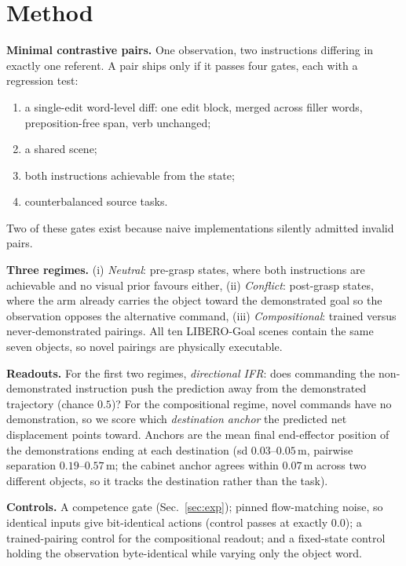 \documentclass{article}
\begin{document}
\section{Method}
\label{sec:method}

\textbf{Minimal contrastive pairs.} One observation, two instructions differing in exactly one
referent. A pair ships only if it passes four gates, each with a regression test:
\begin{enumerate}[leftmargin=2em,itemsep=0pt,topsep=2pt,label=(\roman*)]
\item a single-edit word-level diff: one edit block, merged across filler words,
  preposition-free span, verb unchanged;
\item a shared scene;
\item both instructions achievable from the state;
\item counterbalanced source tasks.
\end{enumerate}
Two of these gates exist because naive implementations silently admitted invalid pairs.

\textbf{Three regimes.} (i) \emph{Neutral}: pre-grasp states, where both instructions are
achievable and no visual prior favours either, (ii) \emph{Conflict}: post-grasp states, where the arm
already carries the object toward the demonstrated goal so the observation opposes the
alternative command, (iii) \emph{Compositional}: trained versus never-demonstrated pairings. All ten
LIBERO-Goal scenes contain the same seven objects, so novel pairings are physically executable.

\textbf{Readouts.} For the first two regimes, \emph{directional IFR}: does commanding the
non-demonstrated instruction push the prediction away from the demonstrated trajectory (chance
$0.5$)? For the compositional regime, novel commands have no demonstration, so we score which
\emph{destination anchor} the predicted net displacement points toward. Anchors are the mean
final end-effector position of the demonstrations ending at each destination (sd
$0.03$--$0.05$\,m, pairwise separation $0.19$--$0.57$\,m; the cabinet anchor agrees within
$0.07$\,m across two different objects, so it tracks the destination rather than the task).

\textbf{Controls.} A competence gate (Sec.~\ref{sec:exp}); pinned flow-matching noise, so
identical inputs give bit-identical actions (control passes at exactly $0.0$); a trained-pairing
control for the compositional readout; and a fixed-state control holding the observation
byte-identical while varying only the object word.
\end{document}
